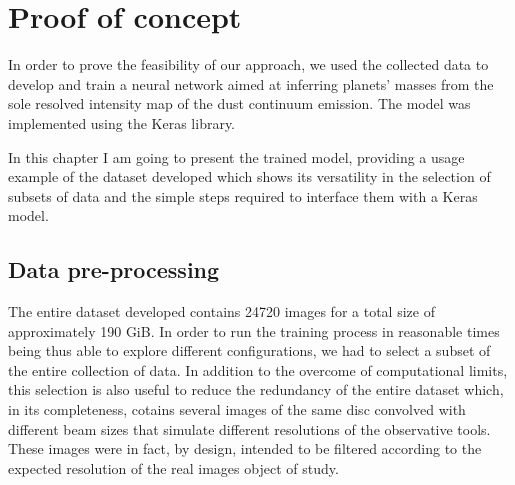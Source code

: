 \documentclass[a4paper,10pt]{report}
\begin{document}
\chapter{Proof of concept}

In order to prove the feasibility of our approach, we used the collected data to develop and train a neural network
aimed at inferring planets' masses from the sole resolved intensity map of the dust continuum emission.
The model was implemented using the Keras library.

In this chapter I am going to present the trained model, providing a usage example of
the dataset developed which shows its versatility in the selection of subsets of data and the simple 
steps required to interface them with a Keras model.


\section{Data pre-processing}

The entire dataset developed contains 24720 images for a total size of approximately 190 GiB.
In order to run the training process in reasonable times being thus able to explore different configurations, we 
had to select a subset of the entire collection of data. In addition to the overcome of computational limits, 
this selection is also useful to reduce the redundancy of the entire dataset which, in its completeness, cotains
several images of the same disc convolved with different beam sizes
that simulate different resolutions of the observative tools.
These images were in fact, by design, intended to be filtered according to the expected resolution of the real
images object of study.
\end{document}
